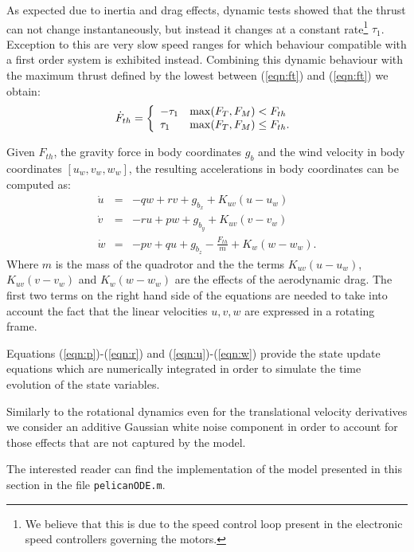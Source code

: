 \documentclass[a4paper,11pt]{report}
\begin{document}
As expected due to inertia and drag effects, dynamic tests showed that the thrust can not change instantaneously, but instead it changes at a constant rate\footnote{We believe that this is due to the speed control loop present in the electronic speed controllers governing the motors.} $\tau_1$. Exception to this are very slow speed ranges for which behaviour compatible with a first order system is exhibited instead. Combining this dynamic behaviour with the maximum thrust defined by the lowest between (\ref{eqn:ft}) and (\ref{eqn:ft}) we obtain:
\begin{equation}
\dot{F}_{th}=\left\{ \begin{array}{l l} -\tau_1 & \max(F_T,F_M)<F_{th} \\ \tau_1  & \max(F_T,F_M)\leq F_{th}. \end{array} \right .\\
\end{equation}

Given $F_{th}$, the gravity force in body coordinates $g_b$ and the wind velocity in body coordinates $[u_w,v_w,w_w]$, the resulting accelerations in body coordinates can be computed as:
\begin{eqnarray}
\dot{u} &=& -q w + r v + g_{b_x} + K_{uv}(u-u_w)\label{eqn:u}\\
\dot{v} &=& -r u + p w + g_{b_y} + K_{uv}(v-v_w)\\
\dot{w} & =& -p v + q u + g_{b_z} - \frac{F_{th}}{m} + K_w (w-w_w). \label{eqn:w}
\end{eqnarray}
Where $m$ is the mass of the quadrotor and the the terms $K_{uv}(u-u_w)$,$K_{uv}(v-v_w)$ and $K_w(w-w_w)$ are the effects of the aerodynamic drag. The first two terms on the right hand side of the equations are needed to take into account the fact that the linear velocities $u,v,w$ are expressed in a rotating frame. 
 
Equations (\ref{eqn:p})-(\ref{eqn:r}) and (\ref{eqn:u})-(\ref{eqn:w}) provide the state update equations which are numerically integrated in order to simulate the time evolution of the state variables.

Similarly to the rotational dynamics even for the translational velocity derivatives we consider an additive Gaussian white noise component in order to account for those effects that are not captured by the model. 

The interested reader can find the implementation of the model presented in this section in the file \texttt{pelicanODE.m}.  
\end{document}
